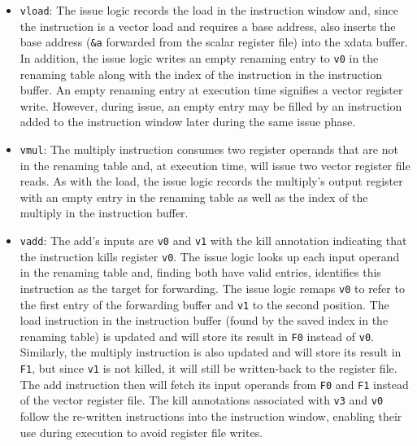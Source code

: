 \begin{itemize}
\item {\tt vload}:
The issue logic records the load in the instruction window and, since the instruction
is a vector load and requires a base address, also inserts the base address ({\tt \&a} forwarded from the scalar register file) into the xdata buffer.
% 
In addition, the issue logic writes an empty renaming entry to {\tt v0} in the renaming table along with the index of the instruction in the instruction buffer.
%
An empty renaming entry at execution time signifies a vector register write.
However, during issue, an empty entry may be filled by an instruction added to
the instruction window later during the same issue phase.
\item {\tt vmul}: The multiply instruction consumes two register operands that are not in the renaming table and, at execution time, will issue
two vector register file reads.
%
As with the load, the issue logic records the multiply's output register with 
an empty entry in the renaming table as well as the index of the multiply in the
instruction buffer.
\item {\tt vadd}:
The add's inputs are {\tt v0} and {\tt v1} with the kill annotation indicating
that the instruction kills register {\tt v0}.
%
The issue logic looks up each input operand in the renaming table and, finding 
both have valid entries, identifies this instruction as the target for forwarding.
%
The issue logic remaps {\tt v0} to refer to the first entry of the forwarding
buffer and {\tt v1} to the second position. 
%
The load instruction in the instruction buffer (found by the saved index in the renaming table) 
is updated and will store its result in {\tt F0} instead of {\tt v0}.
%
Similarly, the multiply instruction is also updated and will store its result in {\tt F1}, but since {\tt v1} is not killed, it will still be written-back to the register file. 
%
The add instruction then will fetch its input operands from {\tt F0}
and {\tt F1} instead of the vector register file.
%
The kill annotations associated with {\tt v3} and {\tt v0} follow the re-written
instructions into the instruction window, enabling their use during execution
to avoid register file writes.
\end{itemize}

\figMANICMANICb

